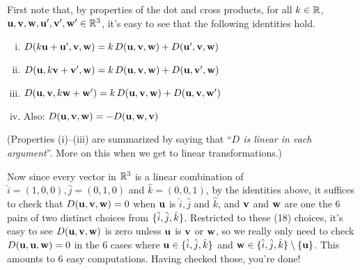 \begin{prob}
First note that, by properties of the dot and cross products,  for all $k\in \mathbb{R}$, $\mathbf{u},\mathbf{v},\mathbf{w},\mathbf{u}',\mathbf{v}',\mathbf{w}' \in \mathbb{R}^3$, it's easy to see that the following identities hold.
 
\medskip
\begin{enumerate}[(i)]
 
\item $D(k \mathbf{u} +\mathbf{u}', \mathbf{v},\mathbf{w}) =k\, D(\mathbf{u},\mathbf{v},\mathbf{w}) +D(\mathbf{u}',\mathbf{v},\mathbf{w})$
\medskip
%

\item  $D(\mathbf{u} , k \mathbf{v} +\mathbf{v}',\mathbf{w}) =k\,D(\mathbf{u},\mathbf{v},\mathbf{w})  + D(\mathbf{u},\mathbf{v}',\mathbf{w})$
\medskip
%
\item $D(\mathbf{u}, \mathbf{v},k \mathbf{w} +\mathbf{w}') =k\, D(\mathbf{u} , \mathbf{v},\mathbf{w})+ D(\mathbf{u}, \mathbf{v},\mathbf{w}')$
\medskip
%
\item Also: $D(\mathbf{u}, \mathbf{v},\mathbf{w}) =-D(\mathbf{u},\mathbf{w},\mathbf{v}) $
\medskip
%
\end{enumerate}

(Properties (i)--(iii) are summarized by saying that ``{\it $D$ is  linear in each argument}''. More on this when we get to linear transformations.)
\medskip 

Now since every vector in $\mathbb{R}^3$ is a linear combination of $\hat i= (1,0,0), \hat j =(0,1,0)$ and $\hat k=(0,0,1)$, by the identities above, it suffices to check that  $D(\mathbf{u},\mathbf{v},\mathbf{w})=0$ when $\mathbf{u}$ is  $\hat i, \hat j$ and $\hat k$, and $\mathbf{v}$ and $\mathbf{w}$ are one the 6 pairs of two distinct choices from $\{\hat i, \hat j, \hat k \}$. Restricted to these (18) choices, it's easy to see   $D(\mathbf{u},\mathbf{v},\mathbf{w})$ is zero unless $\mathbf{u}$ is $\mathbf{v}$ or $\mathbf{w}$, so we really only need to check $D(\mathbf{u},\mathbf{u},\mathbf{w})=0$ in the 6 cases where  $\mathbf{u}\in  \{\hat i, \hat j, \hat k \}$ and   $\mathbf{w} \in\{\hat i, \hat j, \hat k \}\setminus\{\mathbf{u} \}$.   This amounts to 6 easy computations. Having checked those, you're done!  
  
\end{prob} 
